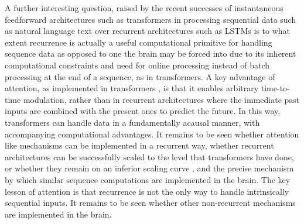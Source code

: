 A further interesting question, raised by the recent successes of instantaneous feedforward architectures such as transformers in processing sequential data such as natural language text over recurrent architectures such as LSTMs is to what extent recurrence is actually a useful computational primitive for handling sequence data as opposed to one the brain may be forced into due to its inherent computational constraints and need for online processing instead of batch processing at the end of a sequence, as in transformers. A key advantage of attention, as implemented in transformers \citep{vaswani2017attention}, is that it enables arbitrary time-to-time modulation, rather than in recurrent architectures where the immediate past inputs are combined with the present ones to predict the future. In this way, transformers can handle data in a fundamentally acausal manner, with accompanying computational advantages. It remains to be seen whether attention like mechanisms can be implemented in a recurrent way, whether recurrent architectures can be successfully scaled to the level that transformers have done, or whether they remain on an inferior scaling curve \citep{kaplan2020scaling}, and the precise mechanism by which similar sequence computations are implemented in the brain. The key lesson of attention is that recurrence is not the only way to handle intrinsically sequential inputs. It remains to be seen whether other non-recurrent mechanisms are implemented in the brain.

